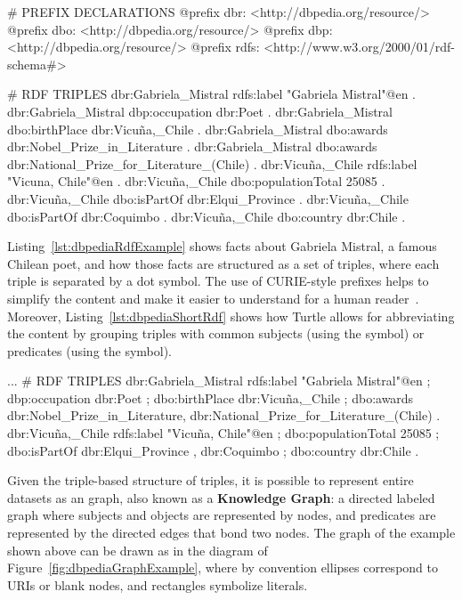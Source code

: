 \begin{sparqlcode}[caption={Set of \RDF{} triples about Gabriela Mistral in DBpedia using Turtle syntax.},label={lst:dbpediaRdfExample}]
# PREFIX DECLARATIONS
@prefix dbr: <http://dbpedia.org/resource/>
@prefix dbo: <http://dbpedia.org/resource/>
@prefix dbp: <http://dbpedia.org/resource/>
@prefix rdfs: <http://www.w3.org/2000/01/rdf-schema#>

# RDF TRIPLES
dbr:Gabriela_Mistral rdfs:label "Gabriela Mistral"@en .
dbr:Gabriela_Mistral dbp:occupation dbr:Poet .
dbr:Gabriela_Mistral dbo:birthPlace dbr:Vicuña,_Chile .
dbr:Gabriela_Mistral dbo:awards dbr:Nobel_Prize_in_Literature .
dbr:Gabriela_Mistral dbo:awards dbr:National_Prize_for_Literature_(Chile) .
dbr:Vicuña,_Chile rdfs:label "Vicuna, Chile"@en .
dbr:Vicuña,_Chile dbo:populationTotal 25085 .
dbr:Vicuña,_Chile dbo:isPartOf dbr:Elqui_Province .
dbr:Vicuña,_Chile dbo:isPartOf dbr:Coquimbo .
dbr:Vicuña,_Chile dbo:country dbr:Chile .
\end{sparqlcode}

Listing~\ref{lst:dbpediaRdfExample} shows facts about Gabriela Mistral, a famous Chilean poet, 
and how those facts are structured as a set of \RDF{} triples, where each triple is separated by a 
dot symbol. The use of CURIE-style prefixes helps to simplify the content and make it easier to 
understand for a human reader~\cite{key:prefixes}. Moreover, Listing~\ref{lst:dbpediaShortRdf} 
shows how Turtle allows for abbreviating the content by grouping triples with common subjects 
(using the \squotestt{;} symbol) or predicates (using the \squotestt{,} symbol).

\begin{sparqlcode}[label={lst:dbpediaShortRdf},caption={Set of \RDF{} abbreviated triples about Gabriela Mistral in DBpedia.}]
...
# RDF TRIPLES
dbr:Gabriela_Mistral rdfs:label "Gabriela Mistral"@en ;
    dbp:occupation dbr:Poet ;
    dbo:birthPlace dbr:Vicuña,_Chile ;
    dbo:awards dbr:Nobel_Prize_in_Literature, dbr:National_Prize_for_Literature_(Chile) .
dbr:Vicuña,_Chile rdfs:label "Vicuña, Chile"@en ;
    dbo:populationTotal 25085 ;
    dbo:isPartOf dbr:Elqui_Province , dbr:Coquimbo ;
    dbo:country dbr:Chile .
\end{sparqlcode}

Given the triple-based structure of \RDF{} triples, it is possible to represent entire 
datasets as an \RDF{} graph, also known as a \textbf{Knowledge Graph}: a directed labeled 
graph where subjects and objects are represented by nodes, and predicates are represented 
by the directed edges that bond two nodes. The \RDF{} graph of the example shown above can be 
drawn as in the diagram of Figure~\ref{fig:dbpediaGraphExample}, where by convention 
ellipses correspond to URIs or blank nodes, and rectangles symbolize literals.

